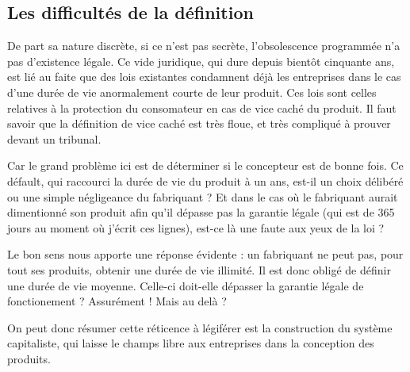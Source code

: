 \subsection{Les difficultés de la définition}

De part sa nature discrète, si ce n'est pas secrète, l'obsolescence programmée n'a pas d'existence légale. Ce vide juridique, qui dure depuis bientôt cinquante ans, est lié au faite que des lois existantes condamnent déjà les entreprises dans le cas d'une durée de vie anormalement courte de leur produit. Ces lois sont celles relatives à la protection du consomateur en cas de vice caché du produit. Il faut savoir que la définition de vice caché est très floue, et très compliqué à prouver devant un tribunal.

Car le grand problème ici est de déterminer si le concepteur est de bonne fois. Ce défault, qui raccourci la durée de vie du produit à un ans, est-il un choix délibéré ou une simple négligeance du fabriquant ? Et dans le cas où le fabriquant aurait dimentionné son produit afin qu'il dépasse pas la garantie légale (qui est de 365 jours au moment où j'écrit ces lignes), est-ce là une faute aux yeux de la loi ?

Le bon sens nous apporte une réponse évidente : un fabriquant ne peut pas, pour tout ses produits, obtenir une durée de vie illimité. Il est donc obligé de définir une durée de vie moyenne. Celle-ci doit-elle dépasser la garantie légale de fonctionement ? Assurément ! Mais au delà ?

On peut donc résumer cette réticence à légiférer est la construction du système capitaliste, qui laisse le champs libre aux entreprises dans la conception des produits.
